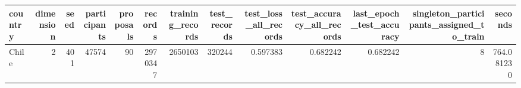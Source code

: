 \begin{tabular}{lrrrrrrrrrrrr}
\toprule
country & dimension & seed & participants & proposals & records & training_records & test_records & test_loss_all_records & test_accuracy_all_records & last_epoch_test_accuracy & singleton_participants_assigned_to_train & seconds \\
\midrule
Chile & 2 & 401 & 47574 & 90 & 2970347 & 2650103 & 320244 & 0.597383 & 0.682242 & 0.682242 & 8 & 764.081230 \\
\bottomrule
\end{tabular}
